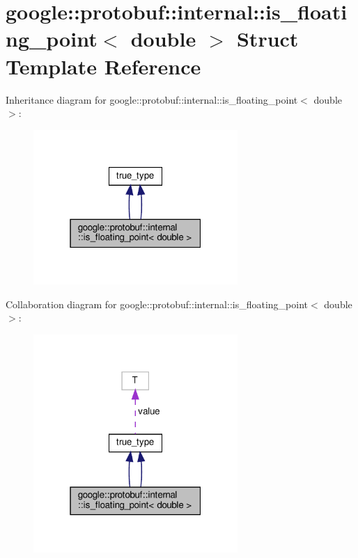 \hypertarget{structgoogle_1_1protobuf_1_1internal_1_1is__floating__point_3_01double_01_4}{}\section{google\+:\+:protobuf\+:\+:internal\+:\+:is\+\_\+floating\+\_\+point$<$ double $>$ Struct Template Reference}
\label{structgoogle_1_1protobuf_1_1internal_1_1is__floating__point_3_01double_01_4}


Inheritance diagram for google\+:\+:protobuf\+:\+:internal\+:\+:is\+\_\+floating\+\_\+point$<$ double $>$\+:
\nopagebreak
\begin{figure}[H]
\begin{center}
\leavevmode
\includegraphics[width=220pt]{structgoogle_1_1protobuf_1_1internal_1_1is__floating__point_3_01double_01_4__inherit__graph}
\end{center}
\end{figure}


Collaboration diagram for google\+:\+:protobuf\+:\+:internal\+:\+:is\+\_\+floating\+\_\+point$<$ double $>$\+:
\nopagebreak
\begin{figure}[H]
\begin{center}
\leavevmode
\includegraphics[width=220pt]{structgoogle_1_1protobuf_1_1internal_1_1is__floating__point_3_01double_01_4__coll__graph}
\end{center}
\end{figure}
